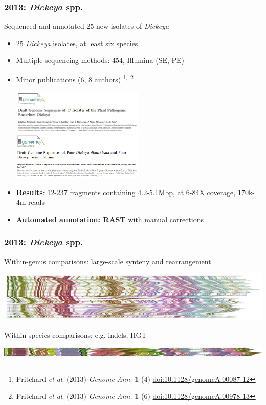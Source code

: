 \begin{frame}
  \frametitle{2013: \textit{Dickeya} spp.}
  Sequenced and annotated 25 new isolates of \textit{Dickeya}
  \begin{itemize}
    \item 25 \textit{Dickeya} isolates, at least six species
    \item Multiple sequencing methods: 454, Illumina (SE, PE)
    \item Minor publications (6, 8 authors)%
\footnote{\tiny{Pritchard \textit{et al}. (2013) \textit{Genome Ann.} \textbf{1} (4) \href{http://dx.doi.org/10.1128/genomeA.00087-12}{doi:10.1128/genomeA.00087-12}}}$^{,}$%
\footnote{\tiny{Pritchard \textit{et al}. (2013) \textit{Genome Ann.} \textbf{1} (6) \href{http://dx.doi.org/10.1128/genomeA.00978-13}{doi:10.1128/genomeA.00978-13}}}\\ 
      \begin{center}
        \includegraphics[width=0.5\textwidth]{images/dickeya_ga1}
        \includegraphics[width=0.5\textwidth]{images/dickeya_ga2}
      \end{center}    
    \item \textbf{Results}: 12-237  fragments containing 4.2-5.1Mbp, at 6-84X coverage, 170k-4m reads
    \item \textbf{Automated annotation: RAST} with manual corrections
  \end{itemize}  
\end{frame}

\begin{frame}
  \frametitle{2013: \textit{Dickeya} spp.}
  Within-genus comparisons: large-scale synteny and rearrangement
  \begin{center}
    \includegraphics[width=1\textwidth]{images/dickeya_core_collinear_small}
  \end{center}    
  Within-species comparisons: e.g. indels, HGT
  \begin{center}
    \includegraphics[width=1\textwidth]{images/collinear_zeae}
  \end{center}      
\end{frame}


